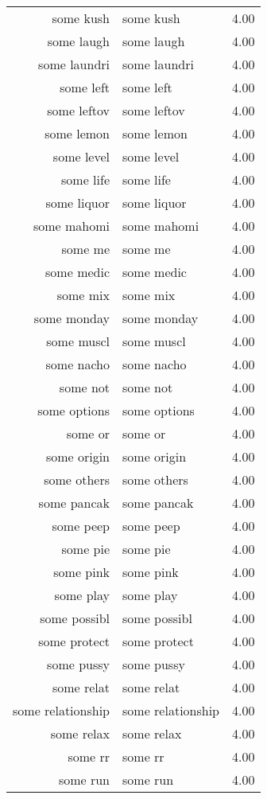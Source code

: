 \begin{table}[ht]
\begin{tabular}{rlr}
  some kush & some kush & 4.00 \\ 
  some laugh & some laugh & 4.00 \\ 
  some laundri & some laundri & 4.00 \\ 
  some left & some left & 4.00 \\ 
  some leftov & some leftov & 4.00 \\ 
  some lemon & some lemon & 4.00 \\ 
  some level & some level & 4.00 \\ 
  some life & some life & 4.00 \\ 
  some liquor & some liquor & 4.00 \\ 
  some mahomi & some mahomi & 4.00 \\ 
  some me & some me & 4.00 \\ 
  some medic & some medic & 4.00 \\ 
  some mix & some mix & 4.00 \\ 
  some monday & some monday & 4.00 \\ 
  some muscl & some muscl & 4.00 \\ 
  some nacho & some nacho & 4.00 \\ 
  some not & some not & 4.00 \\ 
  some options & some options & 4.00 \\ 
  some or & some or & 4.00 \\ 
  some origin & some origin & 4.00 \\ 
  some others & some others & 4.00 \\ 
  some pancak & some pancak & 4.00 \\ 
  some peep & some peep & 4.00 \\ 
  some pie & some pie & 4.00 \\ 
  some pink & some pink & 4.00 \\ 
  some play & some play & 4.00 \\ 
  some possibl & some possibl & 4.00 \\ 
  some protect & some protect & 4.00 \\ 
  some pussy & some pussy & 4.00 \\ 
  some relat & some relat & 4.00 \\ 
  some relationship & some relationship & 4.00 \\ 
  some relax & some relax & 4.00 \\ 
  some rr & some rr & 4.00 \\ 
  some run & some run & 4.00 \\ 

\end{tabular}
\end{table}
